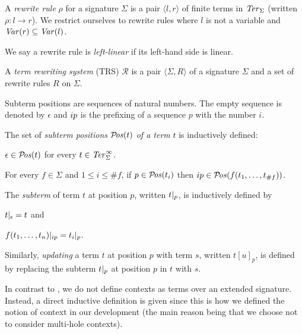 \begin{definition}%
  A \emph{rewrite rule} $\rho$ for a signature $\Sigma$ is a pair $\langle l,
  r \rangle$ of finite terms in $\mathit{Ter}_\Sigma$ (written $\rho : l \rightarrow
  r$). We restrict ourselves to rewrite rules where $l$ is not a variable and
  $\mathit{Var}(r) \subseteq \mathit{Var}(l)$.
\end{definition}

We say a rewrite rule is \emph{left-linear} if its left-hand side is linear.

\begin{definition}%
A \emph{term rewriting system} (TRS) $\mathcal{R}$ is a pair $\langle \Sigma,
R \rangle$ of a signature $\Sigma$ and a set of rewrite rules $R$ on
$\Sigma$.
\end{definition}

Subterm positions are sequences of natural numbers. The empty sequence
is denoted by $\epsilon$ and $i p$ is the prefixing of a
sequence $p$ with the number $i$.

\begin{definition}%
  The set of \emph{subterm positions} $\mathcal{P}\!\mathit{os}(t)$ \emph{of a term} $t$
  is inductively defined:
  \begin{compactenum}
    \item $\epsilon \in \mathcal{P}\!\mathit{os}(t)$ for every $t \in \mathit{Ter}_\Sigma^\infty$.
    \item For every $f \in \Sigma$ and $1 \le i \le \#f$, if $p \in
      \mathcal{P}\!\mathit{os}(t_i)$ then $i p \in \mathcal{P}\!\mathit{os}(f(t_1, \ldots,
      t_{\#f}))$.
  \end{compactenum}
  The \emph{subterm} of term $t$ at position $p$, written
  $t |_{p}$, is inductively defined by
  \begin{inparaenum}[(i)]
    \item $t |_{\epsilon} = t$ and
    \item $f(t_1, \ldots, t_n) |_{i p} =
      t_i |_{p}$.
  \end{inparaenum}
  Similarly, \emph{updating} a term $t$ at position $p$ with term $s$,
  written $t[u]_p$, is defined by replacing the subterm
  $t |_{p}$ at position $p$ in $t$ with $s$.
\end{definition}

In contrast to \cite{terese-03}, we do not define contexts as terms over an
extended signature. Instead, a direct inductive definition is given since this
is how we defined the notion of context in our \Coq development (the main
reason being that we choose not to consider multi-hole contexts).


